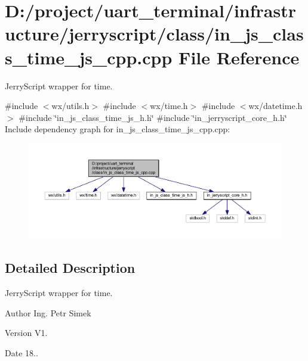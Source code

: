 \section{D\+:/project/uart\+\_\+terminal/infrastructure/jerryscript/class/in\+\_\+js\+\_\+class\+\_\+time\+\_\+js\+\_\+cpp.cpp File Reference}
\label{in__js__class__time__js__cpp_8cpp}


Jerry\+Script wrapper for time.  


{\ttfamily \#include $<$wx/utils.\+h$>$}\newline
{\ttfamily \#include $<$wx/time.\+h$>$}\newline
{\ttfamily \#include $<$wx/datetime.\+h$>$}\newline
{\ttfamily \#include \char`\"{}in\+\_\+js\+\_\+class\+\_\+time\+\_\+js\+\_\+h.\+h\char`\"{}}\newline
{\ttfamily \#include \char`\"{}in\+\_\+jerryscript\+\_\+core\+\_\+h.\+h\char`\"{}}\newline
Include dependency graph for in\+\_\+js\+\_\+class\+\_\+time\+\_\+js\+\_\+cpp.\+cpp\+:\nopagebreak
\begin{figure}[H]
\begin{center}
\leavevmode
\includegraphics[width=350pt]{in__js__class__time__js__cpp_8cpp__incl}
\end{center}
\end{figure}


\subsection{Detailed Description}
Jerry\+Script wrapper for time. 

\begin{DoxyAuthor}{Author}
Ing. Petr Simek 
\end{DoxyAuthor}
\begin{DoxyVersion}{Version}
V1. 
\end{DoxyVersion}
\begin{DoxyDate}{Date}
18.. 
\end{DoxyDate}

